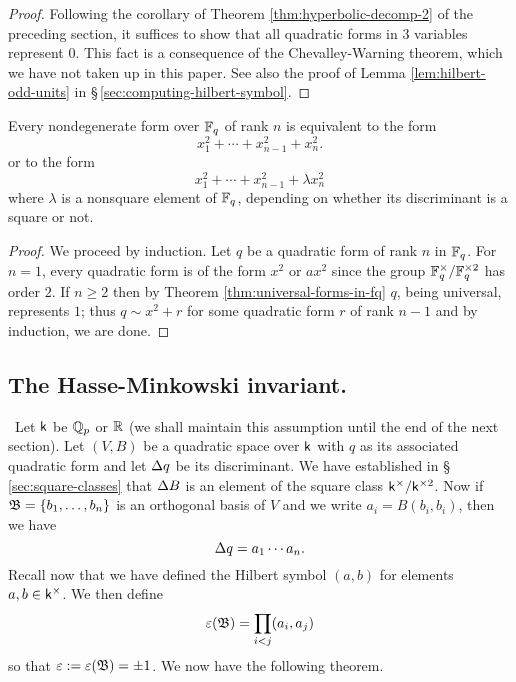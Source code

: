 \begin{proof}
    Following the corollary of Theorem \ref{thm:hyperbolic-decomp-2} of the preceding section, it suffices to show that all quadratic forms in \(3\) variables represent \(0\). This fact is a consequence of the Chevalley-Warning theorem, which we have not taken up in this paper. See also the proof of Lemma \ref{lem:hilbert-odd-units} in \S\,\ref{sec:computing-hilbert-symbol}. 
\end{proof}

\begin{theoremx}\label{thm:quadratic-forms-fq-rank-n}
    Every nondegenerate form over \(\mathbb{F}_q\) of rank \(n\) is equivalent to the form
    \[
        x_1^2 + \cdots + x_{n-1}^2 + x_n^2.
    \]
    or to the form
    \[
        x_1^2 + \cdots + x_{n-1}^2 + \lambda x_n^2
    \]
    where \(\lambda\) is a nonsquare element of \(\mathbb{F}_q\), depending on whether its discriminant is a square or not.
\end{theoremx}

\begin{proof}
    We proceed by induction. Let \(q\) be a quadratic form of rank \(n\) in \(\mathbb{F}_q\). For \(n = 1\), every quadratic form is of the form \(x^2\) or \(ax^2\) since the group \(\mathbb{F}_q^{\times} / \mathbb{F}_q^{\times2}\) has order \(2\). If \(n \geq 2\) then by Theorem \ref{thm:universal-forms-in-fq} \(q\), being universal, represents \(1\); thus \(q \sim x^2 + r\) for some quadratic form \(r\) of rank \(n - 1\) and by induction, we are done.
\end{proof}

\subsection{The Hasse-Minkowski invariant.}~Let \(\mathsf{k}\) be \(\mathbb{Q}_p\) or \(\mathbb{R}\) (we shall maintain this assumption until the end of the next section). Let \((V, B)\) be a quadratic space over \(\mathsf{k}\) with \(q\) as its associated quadratic form and let \({\Delta} q\) be its discriminant. We have established in \S\,\ref{sec:square-classes} that \({\Delta} B\) is an element of the square class \(\mathsf{k}^{\times}/\mathsf{k}^{\times2}\). Now if \(\mathfrak{B} = \{b_1, \dots, b_n\}\) is an orthogonal basis of \(V\) and we write \(a_{i} = B(b_i, b_i)\), then we have\label{sec:hasse-invariant}
\[
    {\Delta} q = a_1 \cdots a_n.  
\]
Recall now that we have defined the Hilbert symbol \((a, b)\) for elements \(a, b \in \mathsf{k}^{\times}\). We then define
\[
    \varepsilon(\mathfrak{B}) = \prod_{i < j} (a_i, a_j)
\]
so that \(\varepsilon := \varepsilon(\mathfrak{B}) = \pm 1\). We now have the following theorem.

